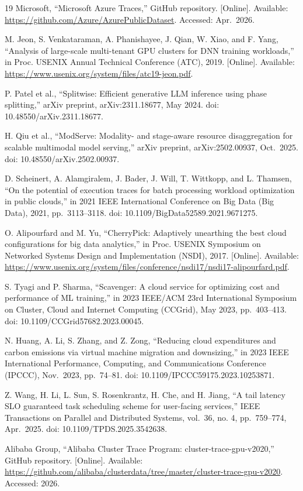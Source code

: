 \documentclass{IEEEtran}
\begin{document}
\begin{thebibliography}{19}
Microsoft, ``Microsoft Azure Traces,'' GitHub repository. {[}Online{]}. Available: \url{https://github.com/Azure/AzurePublicDataset}. Accessed: Apr.~2026.

M. Jeon, S. Venkataraman, A. Phanishayee, J. Qian, W. Xiao, and F. Yang, ``Analysis of large-scale multi-tenant GPU clusters for DNN training workloads,'' in Proc. USENIX Annual Technical Conference (ATC), 2019. {[}Online{]}. Available: \url{https://www.usenix.org/system/files/atc19-jeon.pdf}.

P. Patel et al., ``Splitwise: Efficient generative LLM inference using phase splitting,'' arXiv preprint, arXiv:2311.18677, May 2024. doi: 10.48550/arXiv.2311.18677.

H. Qiu et al., ``ModServe: Modality- and stage-aware resource disaggregation for scalable multimodal model serving,'' arXiv preprint, arXiv:2502.00937, Oct.~2025. doi: 10.48550/arXiv.2502.00937.

D. Scheinert, A. Alamgiralem, J. Bader, J. Will, T. Wittkopp, and L. Thamsen, ``On the potential of execution traces for batch processing workload optimization in public clouds,'' in 2021 IEEE International Conference on Big Data (Big Data), 2021, pp.~3113--3118. doi: 10.1109/BigData52589.2021.9671275.

O. Alipourfard and M. Yu, ``CherryPick: Adaptively unearthing the best cloud configurations for big data analytics,'' in Proc. USENIX Symposium on Networked Systems Design and Implementation (NSDI), 2017. {[}Online{]}. Available: \url{https://www.usenix.org/system/files/conference/nsdi17/nsdi17-alipourfard.pdf}.

S. Tyagi and P. Sharma, ``Scavenger: A cloud service for optimizing cost and performance of ML training,'' in 2023 IEEE/ACM 23rd International Symposium on Cluster, Cloud and Internet Computing (CCGrid), May 2023, pp.~403--413. doi: 10.1109/CCGrid57682.2023.00045.

N. Huang, A. Li, S. Zhang, and Z. Zong, ``Reducing cloud expenditures and carbon emissions via virtual machine migration and downsizing,'' in 2023 IEEE International Performance, Computing, and Communications Conference (IPCCC), Nov.~2023, pp.~74--81. doi: 10.1109/IPCCC59175.2023.10253871.

Z. Wang, H. Li, L. Sun, S. Rosenkrantz, H. Che, and H. Jiang, ``A tail latency SLO guaranteed task scheduling scheme for user-facing services,'' IEEE Transactions on Parallel and Distributed Systems, vol.~36, no. 4, pp.~759--774, Apr.~2025. doi: 10.1109/TPDS.2025.3542638.

Alibaba Group, ``Alibaba Cluster Trace Program: cluster-trace-gpu-v2020,'' GitHub repository. {[}Online{]}. Available: \url{https://github.com/alibaba/clusterdata/tree/master/cluster-trace-gpu-v2020}. Accessed: 2026.

\end{thebibliography}
\end{document}
